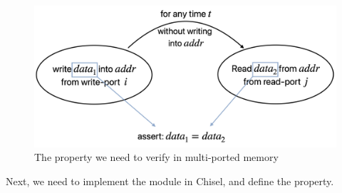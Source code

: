 \documentclass[conference]{IEEEtran}
\theoremstyle{definition}
\begin{document}
\begin{figure}[!htbp]
    \begin{center}
    \includegraphics[width=1\linewidth]{pics/memverify.png}
    \caption{The property we need to verify in multi-ported memory}
    \label{fig: memverify}
    \end{center}
\end{figure}

Next, we need to implement the module in Chisel, and define the property. 








\end{document}
